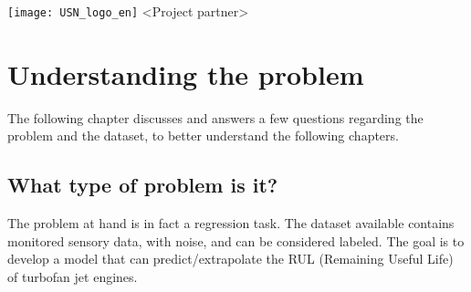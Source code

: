 \documentclass[%
oneside,    %
project,    %
nosummary   %
]{USN-MSc}
\newcommand{\myauthor}{%
Lars Rikard Rådstoga
}
\newcommand{\myparticipants}{
Lars Rikard Rådstoga
}
\begin{document}
\USNtitlepage%
{%
  {}
  \texttt{[image: USN\_logo\_en]}}
{<Project partner>}
{%
  \lipsum[6-7]
}



\tableofcontents
{}





\chapter{Understanding the problem}
\label{ch:understanding}
The following chapter discusses and answers a few questions regarding the problem and the dataset, to better understand the following chapters.

\section{What type of problem is it?}
\label{sec:typeOfProblem}
The problem at hand is in fact a regression task. The dataset available contains monitored sensory data, with noise, and can be considered labeled. The goal is to develop a model that can predict/extrapolate the RUL (Remaining Useful Life) of turbofan jet engines.
\end{document}
